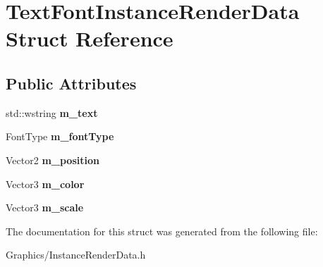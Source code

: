 \hypertarget{structTextFontInstanceRenderData}{}\section{Text\+Font\+Instance\+Render\+Data Struct Reference}
\label{structTextFontInstanceRenderData}
\subsection*{Public Attributes}
\begin{DoxyCompactItemize}
\item 
\mbox{\label{structTextFontInstanceRenderData_a765f775c7f59f1219c030b3467f91c84}} 
std\+::wstring {\bfseries m\+\_\+text}
\item 
\mbox{\label{structTextFontInstanceRenderData_a3550f6ec9d45790bba28dd9756a2bb26}} 
Font\+Type {\bfseries m\+\_\+font\+Type}
\item 
\mbox{\label{structTextFontInstanceRenderData_af9d2b4f6973192c8d58d2e3d381bf40e}} 
Vector2 {\bfseries m\+\_\+position}
\item 
\mbox{\label{structTextFontInstanceRenderData_ad73980872bede164d53e834986cfa6d7}} 
Vector3 {\bfseries m\+\_\+color}
\item 
\mbox{\label{structTextFontInstanceRenderData_af28a15d4445a522acf74abc4d74b57cb}} 
Vector3 {\bfseries m\+\_\+scale}
\end{DoxyCompactItemize}


The documentation for this struct was generated from the following file\+:\begin{DoxyCompactItemize}
\item 
Graphics/Instance\+Render\+Data.\+h\end{DoxyCompactItemize}
